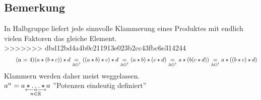 \subsection{Bemerkung}\label{sec:1.4}
In Halbgruppe liefert jede sinnvolle Klammerung eines Produktes mit endlich vielen Faktoren das gleiche Element.\\
>>>>>>> dbd12bd4a4b0c211913e023b2cc43fbc6e314244
\begin{equation}
\tag{n = 4}
(a \star (b \star c)) \star d \underset{\text{AG\footnotemark[1]}}{=} ((a \star b)\star c)\star d \underset{\text{AG\footnotemark[1]}}{=} (a \star b) \star (c \star d) \underset{\text{AG\footnotemark[1]}}{=} a \star (b (c \star d)) \underset{\text{AG\footnotemark}}{=} a \star ((b \star c)\star d)
\end{equation}
Klammern werden daher meist weggelassen.\\
$a^n = \underset{\substack{\longleftarrow n \longrightarrow\\
n \in \mathbb{R}}}{a\star\ldots\star a}$ ''Potenzen eindeutig definiert''
